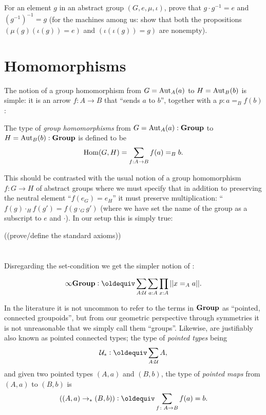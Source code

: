   \begin{xca}
    For an element $g$ in an abstract group $(G,e,\mu,\iota)$, prove that $g\cdot g^{-1}=e$ and $(g^{-1})^{-1}=g$ (for the machines among us: show that both the propositions
$
(\mu{}(g)(\iota{}(g))=e)$ and $
(\iota{}(\iota{}(g))=g)$ are nonempty).
  \end{xca}


\section{Homomorphisms}
\label{sec:homomorphisms}


The notion of a group homomorphism from $G=\mathrm{Aut}_A(a)$ to $H=\mathrm{Aut}_B(b)$ is simple: it is an arrow $f:A\to B$ that ``sends $a$ to $b$'', \ie together with a $p:a=_Bf(b)$:
\begin{definition}\label{def:grouphomomorphism}
  The type of \emph{group homomorphisms} from $G=\mathrm{Aut}_A(a):\mathbf{Group}$ to $H=\mathrm{Aut}_B(b):\mathbf{Group}$ is defined to be
$$\mathrm{Hom}(G,H)=\sum_{f:A\to B}f(a)=_Bb.
$$
\end{definition}
This should be contrasted with the usual notion of a group homomorphism $f\colon G\to H$ of abstract groups where we must specify that in addition to preserving the neutral element ``$f(e_G)=e_H$'' it must preserve multiplication: ``$f(g)\cdot_H f(g')=f(g\cdot_G g')$ (where we have set the name of the group as a subscript to $e$ and $\cdot$).  In our setup this is simply true:

\begin{definition}\label{def:grouphomomaxioms}
  ((prove/define the standard axioms))
\end{definition}


\section{\inftygps}
\label{sec:inftygps}

Disregarding the set-condition we get the simpler notion of \inftygps:
\begin{definition}
  $$\typeinftygp\defequi \sum_{A:\mathcal U}\sum_{a:A}\prod_{x:A}||x=_Aa||.$$
\end{definition}

\begin{remark}\label{rem:pointedtypes}
  In the literature it is not uncommon to refer to the terms in $\mathbf{Group}$ as ``pointed, connected groupoids'', but from our geometric perspective through symmetries it is not unreasonable that we simply call them ``groups''.  Likewise, \inftygps are justifiably also known as pointed connected types;  the type of \emph{pointed types} being
$$\pttype\defequi\sum_{A:\mathcal U}A,$$
and given two pointed types $(A,a)$ and $(B,b)$, the type of \emph{pointed maps} from $(A,a)$ to $(B,b)$ is
$$((A,a)\to_*(B,b))\defequi\sum_{f\colon A\to B}f(a)=b.$$
\end{remark}


